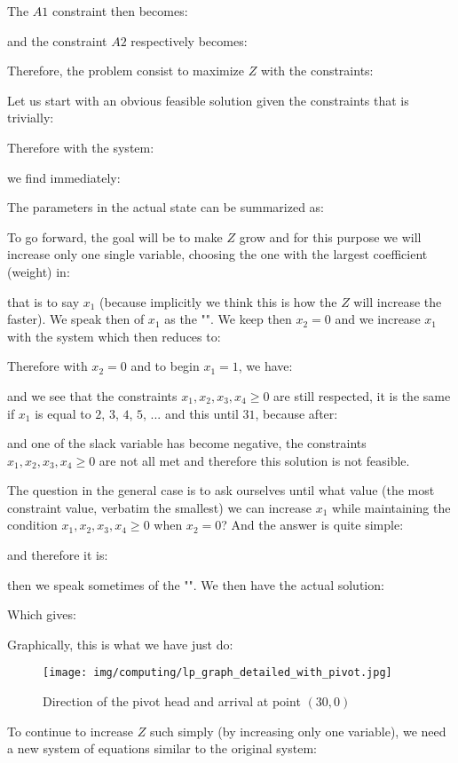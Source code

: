 	The $A1$ constraint then becomes:
	
	and the constraint $A2$ respectively becomes:
	
	Therefore, the problem consist to maximize $Z$ with the constraints:
	
	Let us start with an obvious feasible solution given the constraints that is trivially:
	
	Therefore with the system:
	
	we find immediately:
	
	The parameters in the actual state can be summarized as:
	
	To go forward, the goal will be to make $Z$ grow and for this purpose we will increase only one single variable, choosing the one with the largest coefficient (weight) in:
	
	that is to say $x_1$ (because implicitly we think this is how the $Z$ will increase the faster). We speak then of $x_1$ as the "". We keep then $x_2=0$ and we increase $x_1$ with the system which then reduces to:
	
	Therefore with $x_2=0$ and to begin $x_1=1$, we have:
	
	and we see that the constraints $x_1,x_2,x_3,x_4\geq 0$ are still respected, it is the same if $x_1$ is equal to $2$, $3$, $4$, $5$, ... and this until $31$, because after:
	
	and one of the slack variable has become negative, the constraints $x_1,x_2,x_3,x_4\geq 0$ are not all met and therefore this solution is not feasible.
	
	The question in the general case is to ask ourselves until what value (the most constraint value, verbatim the smallest) we can increase $x_1$ while maintaining the condition $x_1,x_2,x_3,x_4\geq 0$ when $x_2=0$? And the answer is quite simple:
	
	and therefore it is:
	
	then we speak sometimes of the "". We then have the actual solution:
	
	Which gives:
	
	Graphically, this is what we have just do:
	\begin{figure}[H]
		\centering
		\texttt{[image: img/computing/lp\_graph\_detailed\_with\_pivot.jpg]}
		\caption[]{Direction of the pivot head and arrival at point $(30, 0)$}
	\end{figure}
	To continue to increase $Z$ such simply (by increasing only one variable), we need a new system of equations similar to the original system:
	
